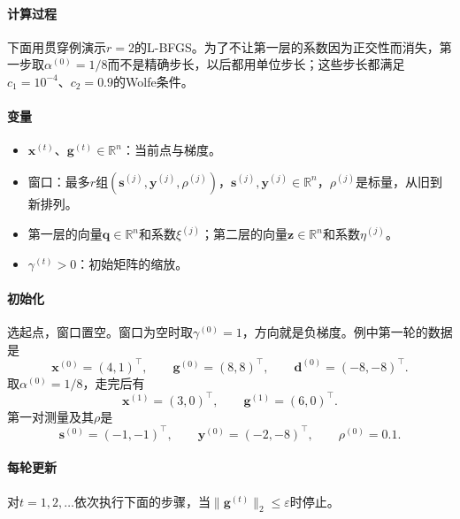 \paragraph{计算过程}
下面用贯穿例演示$r=2$的L-BFGS。为了不让第一层的系数因为正交性而消失，第一步取$\alpha^{(0)}=1/8$而不是精确步长，以后都用单位步长；这些步长都满足$c_1=10^{-4}$、$c_2=0.9$的Wolfe条件。

\paragraph{变量}
\begin{itemize}
 \item $\bm{x}^{(t)}$、$\bm{g}^{(t)}\in\mathbb{R}^{n}$：当前点与梯度。
 \item 窗口：最多$r$组$(\bm{s}^{(j)},\bm{y}^{(j)},\rho^{(j)})$，$\bm{s}^{(j)},\bm{y}^{(j)}\in\mathbb{R}^{n}$，$\rho^{(j)}$是标量，从旧到新排列。
 \item 第一层的向量$\bm{q}\in\mathbb{R}^{n}$和系数$\xi^{(j)}$；第二层的向量$\bm{z}\in\mathbb{R}^{n}$和系数$\eta^{(j)}$。
 \item $\gamma^{(t)}>0$：初始矩阵的缩放。
\end{itemize}

\paragraph{初始化}
选起点，窗口置空。窗口为空时取$\gamma^{(0)}=1$，方向就是负梯度。例中第一轮的数据是
\[
 \bm{x}^{(0)}=(4,1)^\top,\qquad\bm{g}^{(0)}=(8,8)^\top,\qquad\bm{d}^{(0)}=(-8,-8)^\top.
\]
取$\alpha^{(0)}=1/8$，走完后有
\[
 \bm{x}^{(1)}=(3,0)^\top,\qquad\bm{g}^{(1)}=(6,0)^\top.
\]
第一对测量及其$\rho$是
\[
 \bm{s}^{(0)}=(-1,-1)^\top,\qquad\bm{y}^{(0)}=(-2,-8)^\top,\qquad\rho^{(0)}=0.1.
\]

\paragraph{每轮更新}
对$t=1,2,\ldots$依次执行下面的步骤，当$\lVert\bm{g}^{(t)}\rVert_2\leq\varepsilon$时停止。


